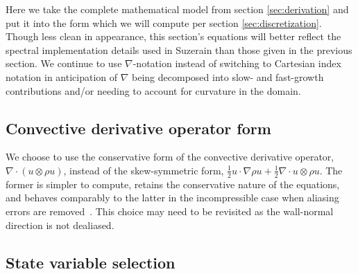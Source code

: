 \documentclass[letterpaper,11pt,nointlimits,reqno]{amsart}
\begin{document}
Here we take the complete mathematical model from section \ref{sec:derivation}
and put it into the form which we will compute per section
\ref{sec:discretization}.  Though less clean in appearance, this section's
equations will better reflect the spectral implementation details used in
Suzerain than those given in the previous section.  We continue to use
$\nabla$-notation instead of switching to Cartesian index notation in
anticipation of $\nabla$ being decomposed into slow- and fast-growth
contributions and/or needing to account for curvature in the domain.

\subsection{Convective derivative operator form}

We choose to use the conservative form of the convective derivative operator,
$\nabla\cdot\left(u\otimes{}\rho{}u\right)$, instead of the skew-symmetric
form, $\frac{1}{2}u\cdot\nabla{}\rho{}u +
\frac{1}{2}\nabla\cdot{}u\otimes{}\rho{}u$.  The former is simpler to compute,
retains the conservative nature of the equations, and behaves comparably to the
latter in the incompressible case when aliasing errors are
removed~\cite{Zang1991Rotation}.  This choice may need to be revisited as the
wall-normal direction is not dealiased.

\subsection{State variable selection}
\label{state_variable_selection}
\end{document}
